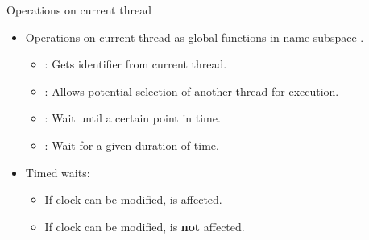 \begin{frame}{Operations on current thread}
\begin{itemize}
  \item Operations on current thread as global functions in name subspace .
    \begin{itemize}
      \item {}: Gets identifier from current thread.
      \item {}: Allows potential selection of another thread for execution.
      \item {}: Wait until a certain point in time.
      \item {}: Wait for a given duration of time.
    \end{itemize}
  \item Timed waits:
    \begin{itemize}
      \item If clock can be modified,  is affected.
      \item If clock can be modified,  is \textbf{not} affected.
    \end{itemize}
\end{itemize}
\end{frame}
